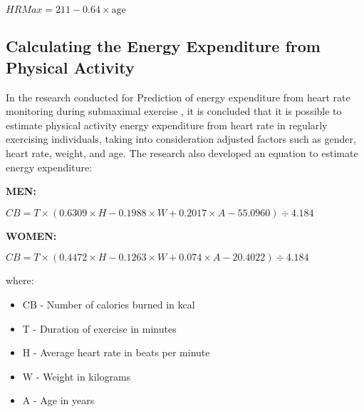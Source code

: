 \begin{center}
\(HRMax = 211 - 0.64 \times \text{{age}}\)
\end{center}
        
\subsection{Calculating the Energy Expenditure from Physical Activity}
In the research conducted for Prediction of energy expenditure from heart rate monitoring during submaximal exercise \autocite{keytel2005energy}, it is concluded that it is possible to estimate physical activity energy expenditure from heart rate in regularly exercising individuals, taking into consideration adjusted factors such as gender, heart rate, weight, and age. The research \autocite{keytel2005energy} also developed an equation to estimate energy expenditure:

\textbf{MEN:}
\begin{center}
    \(CB = T \times (0.6309 \times H  -  0.1988 \times W  +  0.2017 \times A  -  55.0960) \div 4.184 \)
\end{center}

\textbf{WOMEN:}
\begin{center}
    \(CB = T \times (0.4472 \times H  -  0.1263 \times W  +  0.074 \times A  -  20.4022) \div 4.184 \)
\end{center}

where:
\begin{itemize}
    \item CB - Number of calories burned in kcal
    \item T - Duration of exercise in minutes
    \item H - Average heart rate in beats per minute
    \item W - Weight in kilograms
    \item A - Age in years
\end{itemize}